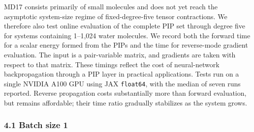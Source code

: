 MD17 consists primarily of small molecules and does not yet reach the asymptotic system-size regime of fixed-degree-five tensor contractions.
We therefore also test online evaluation of the complete PIP set through degree five for systems containing 1--1,024 water molecules.
We record both the forward time for a scalar energy formed from the PIPs and the time for reverse-mode gradient evaluation. The input is a pair-variable matrix, and gradients are taken with respect to that matrix.
These timings reflect the cost of neural-network backpropagation through a PIP layer in practical applications.
Tests run on a single NVIDIA A100 GPU using JAX \texttt{float64}, with the median of seven runs reported.
Reverse propagation costs substantially more than forward evaluation, but remains affordable; their time ratio gradually stabilizes as the system grows.

\subsubsection{4.1 Batch size 1}\label{batch-size-1}

